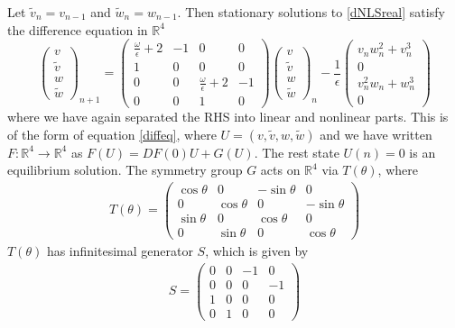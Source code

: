 \documentclass[12pt]{article}
\def\R{{\mathbb R}}
\begin{document}
Let $\tilde{v}_n = v_{n-1}$ and $\tilde{w}_n = w_{n-1}$. Then stationary solutions to \eqref{dNLSreal} satisfy the difference equation in $\R^4$
\begin{equation}\label{dnlsdiffR4}
\begin{pmatrix}
v \\ \tilde{v} \\ w \\ \tilde{w}
\end{pmatrix}_{n+1} =
\begin{pmatrix}
\frac{\omega}{\epsilon} + 2 & -1 & 0 & 0 \\
1 & 0 & 0 & 0 \\
0 & 0 & \frac{\omega}{\epsilon} + 2 & -1 \\
0 & 0 & 1 & 0
\end{pmatrix}
\begin{pmatrix}
v \\ \tilde{v} \\ w \\ \tilde{w}
\end{pmatrix}_n
- \frac{1}{\epsilon} 
\begin{pmatrix}
v_n w_n^2 + v_n^3 \\ 0 \\ v_n^2 w_n + w_n^3 \\ 0
\end{pmatrix}
\end{equation}
where we have again separated the RHS into linear and nonlinear parts. This is of the form of equation \eqref{diffeq}, where $U = (v, \tilde{v}, w, \tilde{w})$ and we have written $F: \R^4 \rightarrow \R^4$ as $F(U) = DF(0) U + G(U)$. The rest state $U(n) = 0$ is an equilibrium solution. The symmetry group $G$ acts on $\R^4$ via $T(\theta)$, where
\begin{align}\label{TdNLS}
T(\theta) =
\begin{pmatrix}
\cos\theta & 0 &-\sin\theta & 0 \\
0 & \cos\theta & 0 &-\sin\theta \\
\sin\theta & 0 & \cos\theta & 0 \\
0 & \sin\theta & 0 & \cos\theta 
\end{pmatrix}
\end{align}
$T(\theta)$ has infinitesimal generator $S$, which is given by
\begin{align}\label{dnlsSgen}
S =
\begin{pmatrix}
0 & 0 &-1 & 0 \\
0 & 0 & 0 &-1 \\
1 & 0 & 0 & 0 \\
0 & 1 & 0 & 0 
\end{pmatrix}
\end{align}
\end{document}
